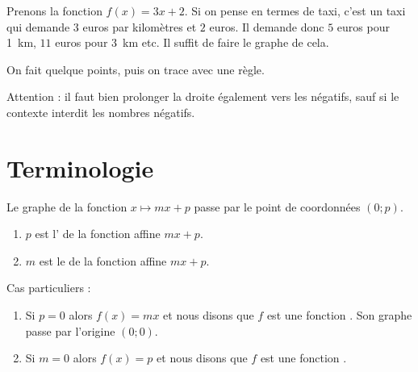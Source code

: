 \begin{example}
    \begin{figure}
   \vspace{-0.5cm}        %
   \centering
   
\end{figure}

    Prenons la fonction \( f(x)=3x+2\). Si on pense en termes de taxi, c'est un taxi qui demande \( 3\) euros par kilomètres et \( 2\) euros. Il demande donc \( 5\) euros pour \SI{1}{\kilo\meter}, \( 11\) euros pour \SI{3}{\kilo\meter} etc. Il suffit de faire le graphe de cela. 


    On fait quelque points, puis on trace avec une règle.

    Attention : il faut bien prolonger la droite également vers les négatifs, sauf si le contexte interdit les nombres négatifs.
    
\end{example}

\section{Terminologie}

\begin{Aretenir}
    Le graphe de la fonction \( x\mapsto mx+p\) passe par le point de coordonnées \( (0;p)\).
    \begin{enumerate}
        \item
            \( p\) est l' de la fonction affine \( mx+p\).
        \item
            \( m\) est le  de la fonction affine \( mx+p\).
    \end{enumerate}
\end{Aretenir}

Cas particuliers :
\begin{enumerate}
    \item
        Si \( p=0\) alors \( f(x)=mx\) et nous disons que \( f\) est une fonction . Son graphe passe par l'origine \( (0;0)\).
    \item
        Si \( m=0\) alors \( f(x)=p\) et nous disons que \( f\) est une fonction .
\end{enumerate}


